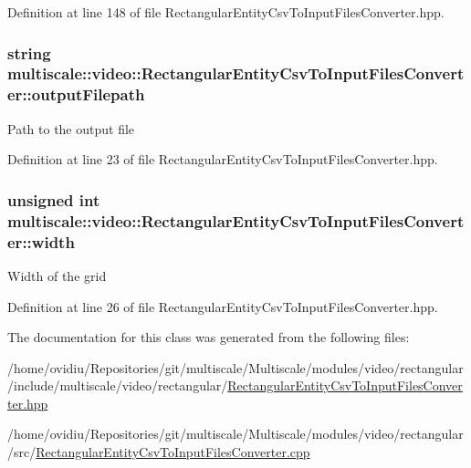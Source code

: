 \-Definition at line 148 of file \-Rectangular\-Entity\-Csv\-To\-Input\-Files\-Converter.\-hpp.

\hypertarget{classmultiscale_1_1video_1_1RectangularEntityCsvToInputFilesConverter_a84ea5fc8e195a17eb929812f962cb851}{
\subsubsection[{output\-Filepath}]{\setlength{\rightskip}{0pt plus 5cm}string {\bf multiscale\-::video\-::\-Rectangular\-Entity\-Csv\-To\-Input\-Files\-Converter\-::output\-Filepath}}}\label{classmultiscale_1_1video_1_1RectangularEntityCsvToInputFilesConverter_a84ea5fc8e195a17eb929812f962cb851}
\-Path to the output file 

\-Definition at line 23 of file \-Rectangular\-Entity\-Csv\-To\-Input\-Files\-Converter.\-hpp.

\hypertarget{classmultiscale_1_1video_1_1RectangularEntityCsvToInputFilesConverter_ac4542ad4008e85ab4860146eed6e0200}{
\subsubsection[{width}]{\setlength{\rightskip}{0pt plus 5cm}unsigned int {\bf multiscale\-::video\-::\-Rectangular\-Entity\-Csv\-To\-Input\-Files\-Converter\-::width}}}\label{classmultiscale_1_1video_1_1RectangularEntityCsvToInputFilesConverter_ac4542ad4008e85ab4860146eed6e0200}
\-Width of the grid 

\-Definition at line 26 of file \-Rectangular\-Entity\-Csv\-To\-Input\-Files\-Converter.\-hpp.



\-The documentation for this class was generated from the following files\-:\begin{DoxyCompactItemize}
\item 
/home/ovidiu/\-Repositories/git/multiscale/\-Multiscale/modules/video/rectangular/include/multiscale/video/rectangular/\hyperlink{RectangularEntityCsvToInputFilesConverter_8hpp}{\-Rectangular\-Entity\-Csv\-To\-Input\-Files\-Converter.\-hpp}\item 
/home/ovidiu/\-Repositories/git/multiscale/\-Multiscale/modules/video/rectangular/src/\hyperlink{RectangularEntityCsvToInputFilesConverter_8cpp}{\-Rectangular\-Entity\-Csv\-To\-Input\-Files\-Converter.\-cpp}\end{DoxyCompactItemize}
